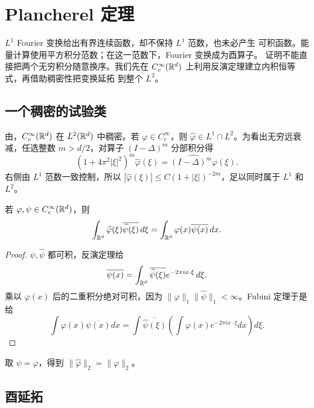 \chapter{Plancherel 定理}
\label{chap:plancherel-theorem}

\(L^1\) Fourier 变换给出有界连续函数，却不保持 \(L^1\) 范数，也未必产生
可积函数。能量计算使用平方积分范数；在这一范数下，Fourier 变换成为酉算子。
证明不能直接把两个无穷积分随意换序。我们先在
\(C_c^\infty(\mathbb{R}^d)\) 上利用反演定理建立内积恒等式，再借助稠密性把变换延拓
到整个 \(L^2\)。

\section{一个稠密的试验类}

由，\(C_c^\infty(\mathbb{R}^d)\) 在
\(L^2(\mathbb{R}^d)\) 中稠密。若 \(\varphi\in C_c^\infty\)，则
\(\widehat\varphi\in L^1\cap L^2\)。为看出无穷远衰减，任选整数
\(m>d/2\)，对算子 \((I-\Delta)^m\) 分部积分得
\[
 (1+4\pi^2|\xi|^2)^m\widehat\varphi(\xi)
 =\widehat{(I-\Delta)^m\varphi}(\xi).
\]
右侧由 \(L^1\) 范数一致控制，所以
\(|\widehat\varphi(\xi)|\le C(1+|\xi|)^{-2m}\)，足以同时属于
\(L^1\) 和 \(L^2\)。

\begin{proposition}[Parseval 公式]\label{prop:fourier-parseval-test}
若 \(\varphi,\psi\in C_c^\infty(\mathbb{R}^d)\)，则
\[
 \int_{\mathbb{R}^d}\widehat\varphi(\xi)\overline{\widehat\psi(\xi)}\,d\xi
 =\int_{\mathbb{R}^d}\varphi(x)\overline{\psi(x)}\,dx.
\]
\end{proposition}
\begin{proof}
\(\psi,\widehat\psi\) 都可积，反演定理给
\[
 \overline{\psi(x)}
 =\int_{\mathbb{R}^d}\overline{\widehat\psi(\xi)}e^{-2\pi ix\cdot\xi}\,d\xi.
\]
乘以 \(\varphi(x)\) 后的二重积分绝对可积，因为
\(\|\varphi\|_1\|\widehat\psi\|_1<\infty\)。Fubini 定理于是给
\[
 \int\varphi(x)\overline{\psi(x)}dx
 =\int\overline{\widehat\psi(\xi)}
      \left(\int\varphi(x)e^{-2\pi ix\cdot\xi}dx\right)d\xi.
\]
\end{proof}

取 \(\psi=\varphi\)，得到 \(\|\widehat\varphi\|_2=\|\varphi\|_2\)。

\section{酉延拓}


